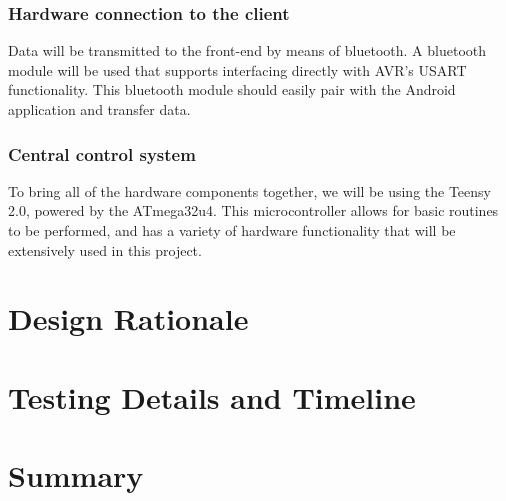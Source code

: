 \documentclass[draftclsnofoot,onecolumn,letterpaper,10pt]{IEEEtran}
\begin{document}
\subsubsection{Hardware connection to the client}
Data will be transmitted to the front-end by means of bluetooth. A bluetooth module will be used that supports interfacing directly with AVR's
USART functionality. This bluetooth module should easily pair with the Android application and transfer data.

\subsubsection{Central control system}
To bring all of the hardware components together, we will be using the Teensy 2.0, powered by the ATmega32u4. This microcontroller allows for basic
routines to be performed, and has a variety of hardware functionality that will be extensively used in this project.

\section{Design Rationale}

\section{Testing Details and Timeline}

\section{Summary}



\end{document}
